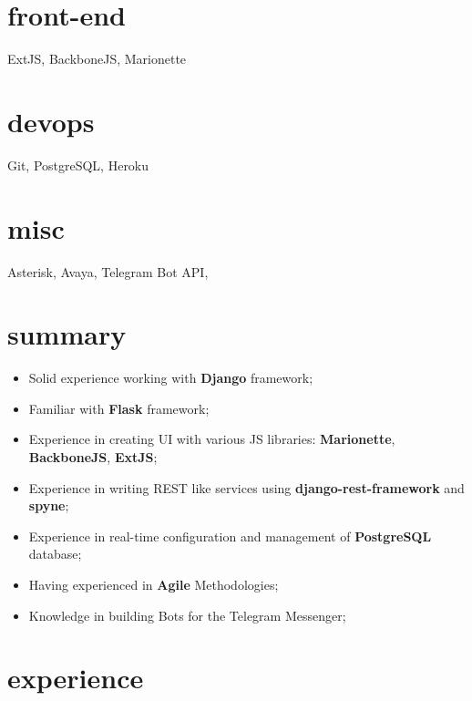 \documentclass[]{cv-style}
\begin{document}
\begin{aside}
\section{front-end}
ExtJS, BackboneJS, Marionette
%
\section{devops}
Git, PostgreSQL, Heroku
%
\section{misc}
Asterisk, Avaya, Telegram Bot API, 
%
\end{aside}

\section{summary}

\begin{itemize}
    \item Solid experience working with \textbf{Django} framework;
    \item Familiar with \textbf{Flask} framework;
    \item Experience in creating UI with various JS libraries: \textbf{Marionette}, \textbf{BackboneJS}, \textbf{ExtJS};
    \item Experience in writing REST like services using \textbf{django-rest-framework} and \textbf{spyne};
    \item Experience in real-time configuration and management of \textbf{PostgreSQL} database;
    \item Having experienced in \textbf{Agile} Methodologies;
    \item Knowledge in building Bots for the Telegram Messenger;
\end{itemize}

\section{experience}
\end{document}
